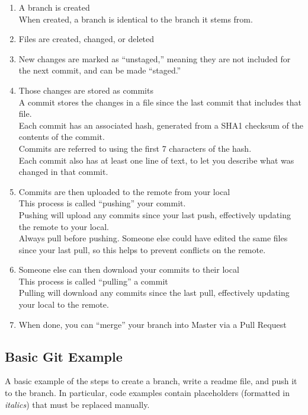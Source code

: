 \documentclass{article}
\begin{document}
\begin{enumerate}
	\item A branch is created
		\\When created, a branch is identical to the branch it stems from.
	\item Files are created, changed, or deleted
	\item New changes are marked as ``unstaged,'' meaning they are not included for the next commit, and can be made ``staged.''
	\item Those changes are stored as commits
		\\A commit stores the changes in a file since the last commit that includes that file.
		\\Each commit has an associated hash, generated from a SHA1 checksum of the contents of the commit.
		\\Commits are referred to using the first 7 characters of the hash.
		\\Each commit also has at least one line of text, to let you describe what was changed in that commit.
	\item Commits are then uploaded to the remote from your local
		\\This process is called ``pushing'' your commit.
		\\Pushing will upload any commits since your last push, effectively updating the remote to your local.
		\\Always pull before pushing. Someone else could have edited the same files since your last pull, so this helps to prevent conflicts on the remote.
	\item Someone else can then download your commits to their local
		\\This process is called ``pulling'' a commit
		\\Pulling will download any commits since the last pull, effectively updating your local to the remote.
	\item When done, you can ``merge'' your branch into Master via a Pull Request
\end{enumerate}
\subsection{Basic Git Example}

A basic example of the steps to create a branch, write a readme file, and push it to the branch. 
In particular, code examples contain placeholders (formatted in \textit{italics}) that must be replaced manually. \\
\end{document}
